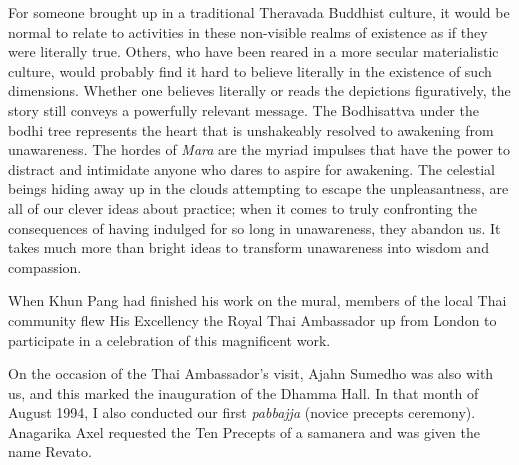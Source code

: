 For someone brought up in a traditional Theravada Buddhist culture, it
would be normal to relate to activities in these non-visible realms of
existence as if they were literally true. Others, who have been reared
in a more secular materialistic culture, would probably find it hard to
believe literally in the existence of such dimensions. Whether one
believes literally or reads the depictions figuratively, the story still
conveys a powerfully relevant message. The Bodhisattva under the bodhi
tree represents the heart that is unshakeably resolved to awakening from
unawareness. The hordes of \emph{Mara} are the myriad impulses that have
the power to distract and intimidate anyone who dares to aspire for
awakening. The celestial beings hiding away up in the clouds attempting
to escape the unpleasantness, are all of our clever ideas about
practice; when it comes to truly confronting the consequences of having
indulged for so long in unawareness, they abandon us. It takes much more
than bright ideas to transform unawareness into wisdom and compassion.

When Khun Pang had finished his work on the mural, members of the local
Thai community flew His Excellency the Royal Thai Ambassador up from
London to participate in a celebration of this magnificent work.

On the occasion of the Thai Ambassador's visit, Ajahn Sumedho was also
with us, and this marked the inauguration of the Dhamma Hall. In that
month of August 1994, I also conducted our first \emph{pabbajja} (novice
precepts ceremony). Anagarika Axel requested the Ten Precepts of a
samanera and was given the name Revato.

